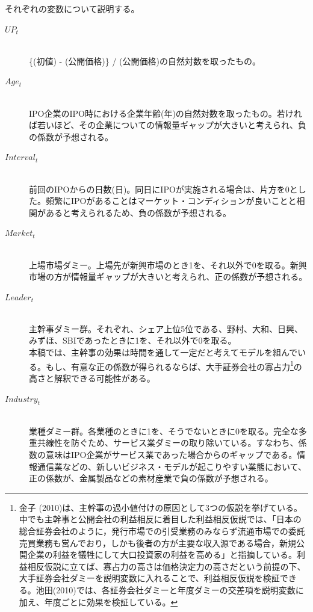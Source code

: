 \documentclass{jsarticle}
\begin{document}
それぞれの変数について説明する。\par
\begin{description}
 \item[$UP_t$]\mbox{}\\ 
 \{(初値) - (公開価格)\} / (公開価格)の自然対数を取ったもの。
  \item[$Age_t$]\mbox{}\\
  IPO企業のIPO時における企業年齢(年)の自然対数を取ったもの。若ければ若いほど、その企業についての情報量ギャップが大きいと考えられ、負の係数が予想される。
  \item[$Interval_t$]\mbox{}\\
  前回のIPOからの日数(日)。同日にIPOが実施される場合は、片方を0とした。頻繁にIPOがあることはマーケット・コンディションが良いことと相関があると考えられるため、負の係数が予想される。
  \item[$Market_t$]\mbox{}\\
  上場市場ダミー。上場先が新興市場のとき1を、それ以外で0を取る。新興市場の方が情報量ギャップが大きいと考えられ、正の係数が予想される。
  \item[$Leader_t$]\mbox{}\\
  主幹事ダミー群。それぞれ、シェア上位5位である、野村、大和、日興、みずほ、SBIであったときに1を、それ以外で0を取る。\\
  本稿では、主幹事の効果は時間を通して一定だと考えてモデルを組んでいる。もし、有意な正の係数が得られるならば、大手証券会社の寡占力\footnote[13]{金子 (2010)\cite{kaneko}は、主幹事の過小値付けの原因として3つの仮説を挙げている。中でも主幹事と公開会社の利益相反に着目した利益相反仮説では、「日本の総合証券会社のように，発行市場での引受業務のみならず流通市場での委託売買業務も営んでおり，しかも後者の方が主要な収入源である場合，新規公開企業の利益を犠牲にして大口投資家の利益を高める」と指摘している。利益相反仮説に立てば、寡占力の高さは価格決定力の高さだという前提の下、大手証券会社ダミーを説明変数に入れることで、利益相反仮説を検証できる。池田(2010)\cite{ikeda2}では、各証券会社ダミーと年度ダミーの交差項を説明変数に加え、年度ごとに効果を検証している。}の高さと解釈できる可能性がある。
  \item[$Industry_t$]\mbox{}\\
  業種ダミー群。各業種のときに1を、そうでないときに0を取る。完全な多重共線性を防ぐため、サービス業ダミーの取り除いている。すなわち、係数の意味はIPO企業がサービス業であった場合からのギャップである。情報通信業などの、新しいビジネス・モデルが起こりやすい業態において、正の係数が、金属製品などの素材産業で負の係数が予想される。
\end{description}\par
\end{document}
